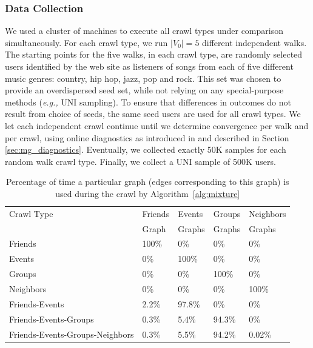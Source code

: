 \documentclass[10pt, conference]{./IEEEtran}
\newcommand{\eg}{{\em e.g., }}
\begin{document}
%
%
%
%

\subsubsection{Data Collection}
We used a cluster of machines to execute all crawl types under comparison simultaneously.  For each crawl type, we run $|V_0|=5$ different independent walks. The starting points for the five walks, in each crawl type, are randomly selected users identified by the web site as listeners of songs from each of five different music genres: country, hip hop, jazz, pop and rock.  This set was chosen to provide an overdispersed seed set, while not relying on any special-purpose methods (\eg UNI sampling).  To ensure that differences in outcomes do not result from choice of seeds, the same seed users are used for all crawl types.  We let each independent crawl continue until we determine convergence per walk and per crawl, using online diagnostics as introduced in \cite{Gjoka2010} and described in Section \ref{sec:mg_diagnostics}. Eventually, we collected  exactly 50K samples for each random walk crawl type.
%
 Finally, we collect a UNI sample of 500K users.



\begin{table}[t!]
\begin{center}
\begin{tabular}{@{}l@{}||@{\,}l|@{\,}l|@{\,}l|@{\,}l}
Crawl Type                       & Friends  & Events  & Groups  & Neighbors  \\
                                 & Graph   & Graphs   & Graphs  &  Graphs    \\
\hline \hline
Friends                          & 100\%   & 0\%      & 0\%     &    0\%     \\
\hline
Events                           &   0\%   &  100\%   & 0\%     &    0\%     \\
\hline
Groups                           &   0\%   &   0\%    & 100\%   &    0\%     \\
\hline
Neighbors                        &   0\%   &   0\%    &   0\%   &  100\%     \\
\hline
Friends-Events                   & 2.2\%   &   97.8\% & 0\%     &    0\%     \\
\hline
Friends-Events-Groups            & 0.3\% &   5.4\%  & 94.3\%    &    0\%     \\
\hline
Friends-Events-Groups-Neighbors  & 0.3\% &   5.5\%  & 94.2\%    &   0.02\%   \\
\end{tabular}
\end{center}
\caption{Percentage of time a particular graph (edges corresponding to this graph) is used during the crawl by Algorithm~\ref{alg:mixture}}
\label{tab:percentage_multigraph}
\end{table}
\end{document}
